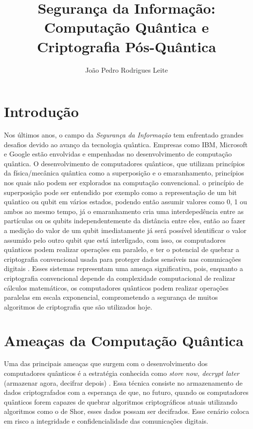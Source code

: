 \documentclass[12pt]{article}
\title{Segurança da Informação: Computação Quântica e Criptografia Pós-Quântica}
\author{João Pedro Rodrigues Leite}
\begin{document}
	
	\maketitle
	
	\section{Introdução}
	Nos últimos anos, o campo da \textit{Segurança da Informação} tem enfrentado grandes desafios devido ao avanço da tecnologia quântica. Empresas como IBM, Microsoft e Google estão envolvidas e empenhadas no desenvolvimento de computação quântica. O desenvolvimento de computadores quânticos, que utilizam princípios da física/mecânica quântica como a superposição e o emaranhamento, princípios nos quais não podem ser explorados na computação convencional. o princípio de superposição pode ser entendido por exemplo como a representação de um bit quântico ou qubit em vários estados, podendo então assumir valores como 0, 1 ou ambos ao mesmo tempo, já o emaranhamento cria uma interdepedência entre as partículas ou os qubits independentemente da distância entre eles, então ao fazer a medição do valor de um qubit imediatamente já será possível identificar o valor assumido pelo outro qubit que está interligado, com isso, os computadores quânticos podem realizar operações em paralelo, e ter o potencial de quebrar a criptografia convencional usada para proteger dados sensíveis nas comunicações digitais \cite{mitra2017quantum}. Esses sistemas representam uma ameaça significativa, pois, enquanto a criptografia convencional depende da complexidade computacional de realizar cálculos matemáticos, os computadores quânticos podem realizar operações paralelas em escala exponencial, comprometendo a segurança de muitos algoritmos de criptografia que são utilizados hoje.
	
	\section{Ameaças da Computação Quântica}
	Uma das principais ameaças que surgem com o desenvolvimento dos computadores quânticos é a estratégia conhecida como \textit{store now, decrypt later} (armazenar agora, decifrar depois) \cite{argetsinger2024promise}. Essa técnica consiste no armazenamento de dados criptografados com a esperança de que, no futuro, quando os computadores quânticos forem capazes de quebrar algoritmos criptográficos atuais utilizando algoritmos como o de Shor, esses dados possam ser decifrados. Esse cenário coloca em risco a integridade e confidencialidade das comunicações digitais.
	
\end{document}
